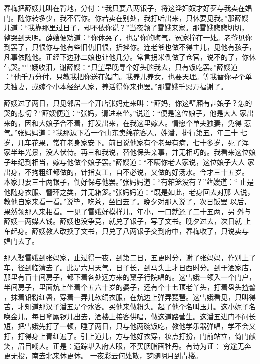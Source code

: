 春梅把薛嫂儿叫在背地，分付：“我只要八两银子，将这淫妇奴才好歹与我卖在娼
门。随你转多少，我不管你。你若卖在别处，我打听出来，只休要见我。”那薛嫂
儿道：“我靠那里过日子，却不依你说？”当夜领了雪娥来家。那雪娥悲悲切切，
整哭到天明。薛嫂便劝道：“你休哭了，也是你的晦气，冤家撞在一处。老爷见你
到罢了，只恨你与他有些旧仇旧恨，折挫你。连老爷也做不得主儿，见他有孩子，
凡事依随他。正经下边孙二娘也让他几分。常言拐米倒做了仓官，说不的了，你休
气哭。”雪娥收泪，谢薛嫂：“只望早晚寻个好头脑我去，只有饭吃罢。”薛嫂道
：“他千万分付，只教我把你送在娼门。我养儿养女，也要天理。等我替你寻个单
夫独妻，或嫁个小本经纪人家，养活得你来也罢。”那雪娥千恩万福谢了。

薛嫂过了两日，只见邻居一个开店张妈走来叫：“薛妈，你这壁厢有甚娘子？怎的
哭的悲切？”薛嫂便道：“张妈，请进来坐。”说道：“便是这位娘子，他是大人
家出来的，因和大娘子合不着，打发出来，在我这里嫁人。情愿个单夫独妻，免得
惹气。”张妈妈道：“我那边下着一个山东卖绵花客人，姓潘，排行第五，年三十
七岁，几车花果，常在老身家安下。前日说他家有个老母有病，七十多岁，死了浑
家半年光景，没人伏侍。再三和我说，替他保头亲事，并无相巧的。我看来这位娘
子年纪到相当，嫁与他做个娘子罢。”薛嫂道：“不瞒你老人家说，这位娘子大人
家出身，不拘粗细都做的，针指女工，自不必说，又做的好汤水。今才三十五岁。
本家只要三十两银子，倒好保与他罢。”张妈妈道：“有箱笼没有？”薛嫂道：“
止是他随身衣服、簪环之类，并无箱笼。”张妈妈道：“既是如此，老身回去对那
人说，教他自家来看一看。”说毕，吃茶，坐回去了。晚夕对那人说了，次日饭罢
以后，果然领那人来相看。一见了雪娥好模样儿，年小，一口就还了二十五两，另
外与薛嫂一两媒人钱。薛嫂也没争竞，就兑了银子，写了文书。晚夕过去，次日就
上车起身。薛嫂教人改换了文书，只兑了八两银子交到府中，春梅收了，只说卖与
娼门去了。

那人娶雪娥到张妈家，止过得一夜，到第二日，五更时分，谢了张妈妈，作别上了
车，径到临清去了。此是六月天气，日子长，到马头上才日西时分。到于洒家店，
那里有百十间房子，都下着各处远方来的窠子行院唱的。这雪娥一领入一个门户，
半间房子，里面炕上坐着个五六十岁的婆子，还有个十七顶老丫头，打着盘头揸髻
，抹着铅粉红唇，穿着一弄儿软绢衣服，在炕边上弹弄琵琶。这雪娥看见，只叫得
苦，才知道那汉子潘五是个水客。买他来做粉头。起了他个名叫玉儿。这小妮子名
唤金儿，每日拿厮锣儿出去，酒楼上接客供唱，做这道路营生。这潘五进门不问长
短，把雪娥先打了一顿，睡了两日，只与他两碗饭吃，教他学乐器弹唱，学不会又
打，打得身上青红遍了。引上道儿，方与他好衣穿，妆点打扮，门前站立，倚门献
笑，眉目嘲人。正是：遗踪堪入府人眼，不买胭脂画牡丹。有诗为证：
穷途无奔更无投，南去北来休更休。
一夜彩云何处散，梦随明月到青楼。

